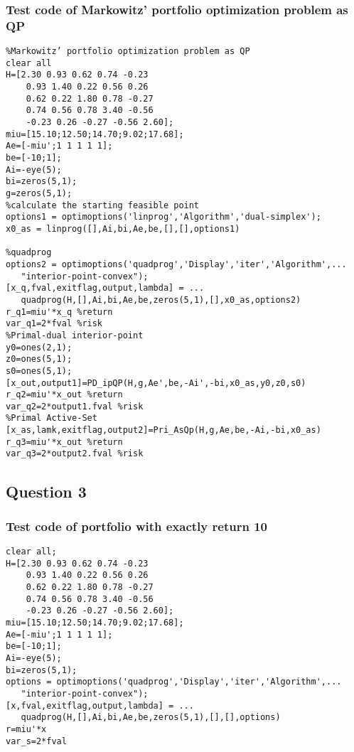 \subsubsection{\bfseries Test code of Markowitz’ portfolio optimization problem as QP}
\label{6.2.7}
{\setmainfont{Courier New Bold} \scriptsize         
\begin{lstlisting}
%Markowitz’ portfolio optimization problem as QP
clear all
H=[2.30 0.93 0.62 0.74 -0.23
    0.93 1.40 0.22 0.56 0.26
    0.62 0.22 1.80 0.78 -0.27
    0.74 0.56 0.78 3.40 -0.56
    -0.23 0.26 -0.27 -0.56 2.60];
miu=[15.10;12.50;14.70;9.02;17.68];
Ae=[-miu';1 1 1 1 1];
be=[-10;1];
Ai=-eye(5);
bi=zeros(5,1);
g=zeros(5,1);
%calculate the starting feasible point 
options1 = optimoptions('linprog','Algorithm','dual-simplex');
x0_as = linprog([],Ai,bi,Ae,be,[],[],options1)

%quadprog
options2 = optimoptions('quadprog','Display','iter','Algorithm',...
   "interior-point-convex");
[x_q,fval,exitflag,output,lambda] = ...
   quadprog(H,[],Ai,bi,Ae,be,zeros(5,1),[],x0_as,options2)
r_q1=miu'*x_q %return
var_q1=2*fval %risk
%Primal-dual interior-point
y0=ones(2,1);
z0=ones(5,1);
s0=ones(5,1);
[x_out,output1]=PD_ipQP(H,g,Ae',be,-Ai',-bi,x0_as,y0,z0,s0)
r_q2=miu'*x_out %return
var_q2=2*output1.fval %risk
%Primal Active-Set
[x_as,lamk,exitflag,output2]=Pri_AsQp(H,g,Ae,be,-Ai,-bi,x0_as)
r_q3=miu'*x_out %return
var_q3=2*output2.fval %risk

\end{lstlisting}}
\subsection{\bfseries Question 3 }

\subsubsection{\bfseries Test code of portfolio with exactly return 10}
\label{6.3.1}
{\setmainfont{Courier New Bold} \scriptsize         
\begin{lstlisting}
clear all;
H=[2.30 0.93 0.62 0.74 -0.23
    0.93 1.40 0.22 0.56 0.26
    0.62 0.22 1.80 0.78 -0.27
    0.74 0.56 0.78 3.40 -0.56
    -0.23 0.26 -0.27 -0.56 2.60];
miu=[15.10;12.50;14.70;9.02;17.68];
Ae=[-miu';1 1 1 1 1];
be=[-10;1];
Ai=-eye(5);
bi=zeros(5,1);
options = optimoptions('quadprog','Display','iter','Algorithm',...
   "interior-point-convex");
[x,fval,exitflag,output,lambda] = ...
   quadprog(H,[],Ai,bi,Ae,be,zeros(5,1),[],[],options)
r=miu'*x
var_s=2*fval
\end{lstlisting}}
